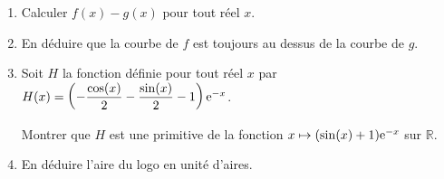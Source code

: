 \documentclass[11pt,fleqn, openany]{book} %
\begin{document}
\begin{exercise}[topic=trig02, subtitle={(Guyane 2018)}]
\begin{center}
\begin{tikzpicture}[scale=0.9]
\end{tikzpicture}
\end{center}

\begin{enumerate}
\item Calculer $f(x)-g(x)$ pour tout réel $x$.
\item En déduire que la courbe de $f$ est toujours au dessus de la courbe de $g$.
\item Soit $H$ la fonction définie pour tout réel $x$ par  $H(x)=\left(-\dfrac{\cos(x)}{2}-\dfrac{ \sin(x)}{2}-1\right)\e^{-x}$. 

Montrer que $H$ est une primitive de la fonction  $x\mapsto (\sin(x)+1)\e^{-x}$ sur $\mathbb{R}$.
\item En déduire l'aire du logo en unité d'aires.
\end{enumerate}

\end{exercise}
\end{document}
